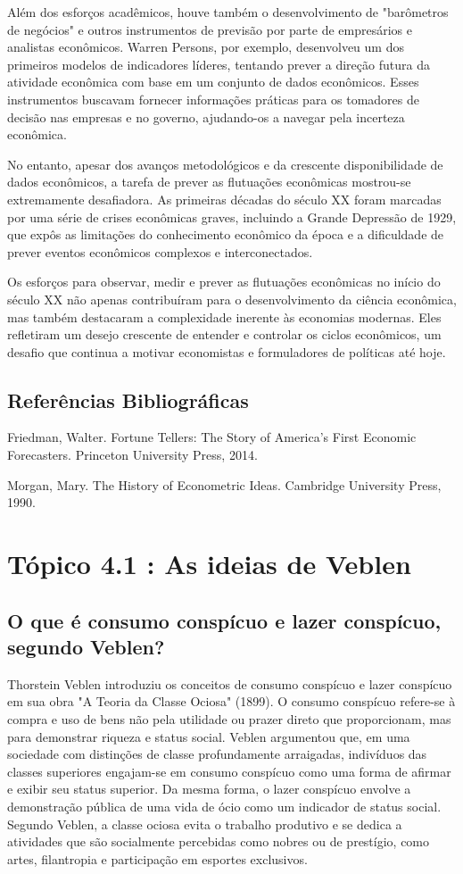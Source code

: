 \documentclass[a4paper,12pt]{article}[abntex2]
\begin{document}
Além dos esforços acadêmicos, houve também o desenvolvimento de "barômetros de negócios" e outros instrumentos de previsão por parte de empresários e analistas econômicos. Warren Persons, por exemplo, desenvolveu um dos primeiros modelos de indicadores líderes, tentando prever a direção futura da atividade econômica com base em um conjunto de dados econômicos. Esses instrumentos buscavam fornecer informações práticas para os tomadores de decisão nas empresas e no governo, ajudando-os a navegar pela incerteza econômica.

No entanto, apesar dos avanços metodológicos e da crescente disponibilidade de dados econômicos, a tarefa de prever as flutuações econômicas mostrou-se extremamente desafiadora. As primeiras décadas do século XX foram marcadas por uma série de crises econômicas graves, incluindo a Grande Depressão de 1929, que expôs as limitações do conhecimento econômico da época e a dificuldade de prever eventos econômicos complexos e interconectados.

Os esforços para observar, medir e prever as flutuações econômicas no início do século XX não apenas contribuíram para o desenvolvimento da ciência econômica, mas também destacaram a complexidade inerente às economias modernas. Eles refletiram um desejo crescente de entender e controlar os ciclos econômicos, um desafio que continua a motivar economistas e formuladores de políticas até hoje.

\subsection{\textbf{Referências Bibliográficas}}
Friedman, Walter. Fortune Tellers: The Story of America's First Economic Forecasters.
Princeton University Press, 2014.

Morgan, Mary. The History of Econometric Ideas. Cambridge University Press, 1990.

\newpage
\section{\textbf{Tópico 4.1 : As ideias de Veblen}}
\subsection{\textbf{O que é consumo conspícuo e lazer conspícuo, segundo Veblen?}}
Thorstein Veblen introduziu os conceitos de consumo conspícuo e lazer conspícuo em sua obra "A Teoria da Classe Ociosa" (1899). O consumo conspícuo refere-se à compra e uso de bens não pela utilidade ou prazer direto que proporcionam, mas para demonstrar riqueza e status social. Veblen argumentou que, em uma sociedade com distinções de classe profundamente arraigadas, indivíduos das classes superiores engajam-se em consumo conspícuo como uma forma de afirmar e exibir seu status superior. Da mesma forma, o lazer conspícuo envolve a demonstração pública de uma vida de ócio como um indicador de status social. Segundo Veblen, a classe ociosa evita o trabalho produtivo e se dedica a atividades que são socialmente percebidas como nobres ou de prestígio, como artes, filantropia e participação em esportes exclusivos.
\end{document}
